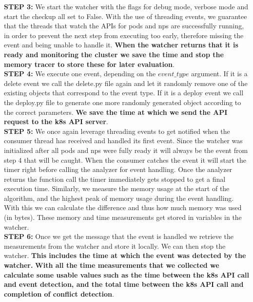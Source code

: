 \textbf{STEP 3:} We start the watcher with the flags for debug mode,  verbose mode and start the checkup all set to False. With the use of threading events, we guarantee that the threads that watch the APIs for pods and \acrshort{np}s are successfully running, in order to prevent the next step from executing too early, therefore missing the event and being unable to handle it. \textbf{When the watcher returns that it is ready and monitoring the cluster we save the time and stop the memory tracer to store these for later evaluation}.
\\[10pt]

\textbf{STEP 4:} We execute one event, depending on the $event\_type$ argument. If it is a delete event we call the delete.py file again and let it randomly remove one of the existing objects that correspond to the event type. If it is a deploy event we call the deploy.py file to generate one more randomly generated object according to the correct parameters. \textbf{We save the time at which we send the API request to the \acrshort{k8s} API server}.
\\[10pt]

\textbf{STEP 5:} We once again leverage threading events to get notified when the consumer thread has received and handled its first event. Since the watcher was initialized after all pods and \acrshort{np}s were fully ready it will always be the event from step 4 that will be caught. When the consumer catches the event it will start the timer right before calling the analyzer for event handling. Once the analyzer returns the function call the timer immediately gets stopped to get a final execution time. Similarly, we measure the memory usage at the start of the algorithm, and the highest peak of memory usage during the event handling. With this we can calculate the difference and thus how much memory was used (in bytes). These memory and time measurements get stored in variables in the watcher.
\\[10pt]

\textbf{STEP 6:} Once we get the message that the event is handled we retrieve the measurements from the watcher and store it locally. We can then stop the watcher. 
\textbf{This includes the time at which the event was detected by the watcher.} \textbf{With all the time measurements that we collected we calculate some usable values such as the time between the \acrshort{k8s} API call and event detection, and the total time between the \acrshort{k8s} API call and completion of conflict detection}.
\\[10pt]

